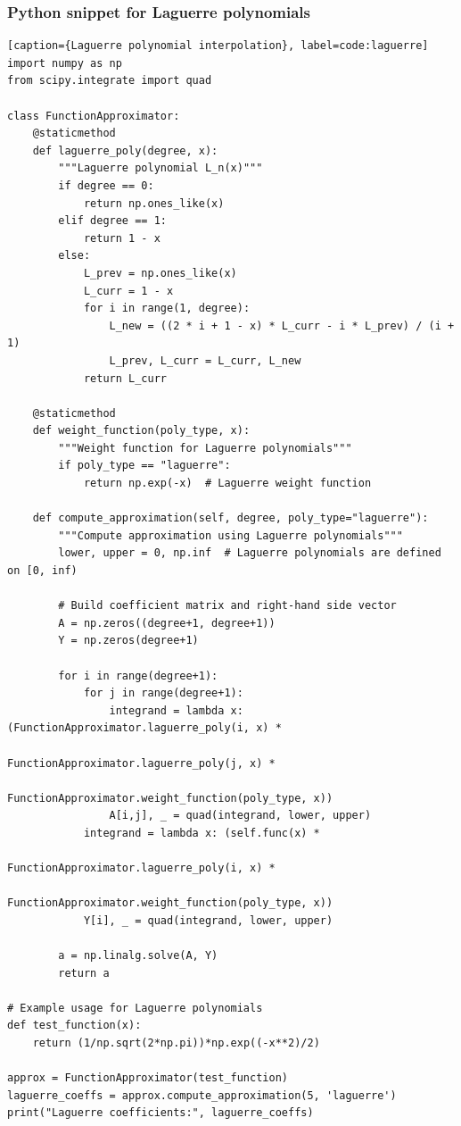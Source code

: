 \documentclass[10pt]{article}
\begin{document}
\subsubsection{Python snippet for Laguerre polynomials}
\begin{lstlisting}[style=custompython][caption={Laguerre polynomial interpolation}, label=code:laguerre]
import numpy as np
from scipy.integrate import quad

class FunctionApproximator:
    @staticmethod
    def laguerre_poly(degree, x):
        """Laguerre polynomial L_n(x)"""
        if degree == 0:
            return np.ones_like(x)
        elif degree == 1:
            return 1 - x
        else:
            L_prev = np.ones_like(x)
            L_curr = 1 - x
            for i in range(1, degree):
                L_new = ((2 * i + 1 - x) * L_curr - i * L_prev) / (i + 1)
                L_prev, L_curr = L_curr, L_new
            return L_curr

    @staticmethod
    def weight_function(poly_type, x):
        """Weight function for Laguerre polynomials"""
        if poly_type == "laguerre":
            return np.exp(-x)  # Laguerre weight function

    def compute_approximation(self, degree, poly_type="laguerre"):
        """Compute approximation using Laguerre polynomials"""
        lower, upper = 0, np.inf  # Laguerre polynomials are defined on [0, inf)
        
        # Build coefficient matrix and right-hand side vector
        A = np.zeros((degree+1, degree+1))
        Y = np.zeros(degree+1)

        for i in range(degree+1):
            for j in range(degree+1):
                integrand = lambda x: (FunctionApproximator.laguerre_poly(i, x) *
                                      FunctionApproximator.laguerre_poly(j, x) *
                                      FunctionApproximator.weight_function(poly_type, x))
                A[i,j], _ = quad(integrand, lower, upper)
            integrand = lambda x: (self.func(x) *
                                  FunctionApproximator.laguerre_poly(i, x) *
                                  FunctionApproximator.weight_function(poly_type, x))
            Y[i], _ = quad(integrand, lower, upper)

        a = np.linalg.solve(A, Y)
        return a

# Example usage for Laguerre polynomials
def test_function(x):
    return (1/np.sqrt(2*np.pi))*np.exp((-x**2)/2)

approx = FunctionApproximator(test_function)
laguerre_coeffs = approx.compute_approximation(5, 'laguerre')
print("Laguerre coefficients:", laguerre_coeffs)
\end{lstlisting}
\end{document}
